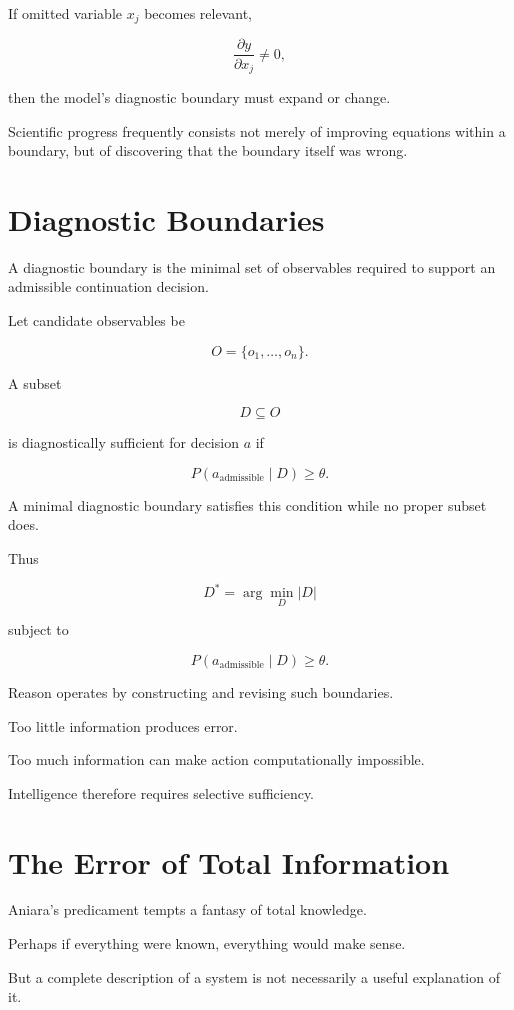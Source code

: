 \documentclass[11pt,oneside]{book}
\theoremstyle{definition}
\theoremstyle{remark}
\begin{document}
If omitted variable \(x_j\) becomes relevant,

\[
\frac{\partial y}{\partial x_j}\neq0,
\]

then the model's diagnostic boundary must expand or change.

Scientific progress frequently consists not merely of improving equations within a boundary, but of discovering that the boundary itself was wrong.

\section{Diagnostic Boundaries}

A diagnostic boundary is the minimal set of observables required to support an admissible continuation decision.

Let candidate observables be

\[
O=\{o_1,\ldots,o_n\}.
\]

A subset

\[
D\subseteq O
\]

is diagnostically sufficient for decision \(a\) if

\[
P(a_{\mathrm{admissible}}\mid D)
\geq\theta.
\]

A minimal diagnostic boundary satisfies this condition while no proper subset does.

Thus

\[
D^\ast
=
\arg\min_D |D|
\]

subject to

\[
P(a_{\mathrm{admissible}}\mid D)
\geq\theta.
\]

Reason operates by constructing and revising such boundaries.

Too little information produces error.

Too much information can make action computationally impossible.

Intelligence therefore requires selective sufficiency.

\section{The Error of Total Information}

Aniara's predicament tempts a fantasy of total knowledge.

Perhaps if everything were known, everything would make sense.

But a complete description of a system is not necessarily a useful explanation of it.
\end{document}
